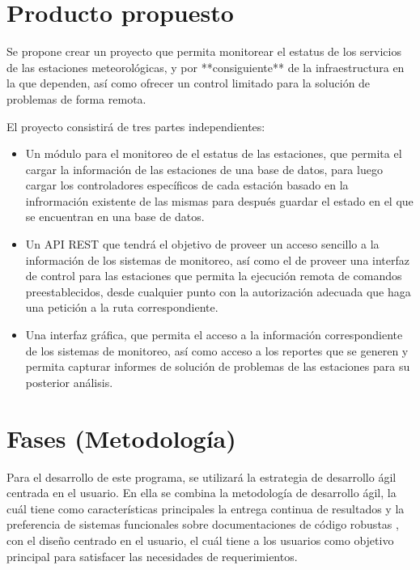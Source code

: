 \section{Producto propuesto}


Se propone crear un proyecto que permita monitorear el estatus de los servicios de las estaciones meteorológicas, y por **consiguiente** de la infraestructura en la que dependen, así como ofrecer un control limitado para la solución de problemas de forma remota.

El proyecto consistirá de tres partes independientes:

\begin{itemize}
   \item Un módulo para el monitoreo de el estatus de las estaciones, que permita el cargar la información de las estaciones de una base de datos, para luego cargar los controladores específicos de cada estación basado en la infrormación existente de las mismas para después guardar el estado en el que se encuentran en una base de datos.

   \item Un API REST que tendrá el objetivo de proveer un acceso sencillo a la información de los sistemas de monitoreo, así como el de proveer una interfaz de control para las estaciones que permita la ejecución remota de comandos preestablecidos, desde cualquier punto con la autorización adecuada que haga una petición a la ruta correspondiente.

   \item Una interfaz gráfica, que permita el acceso a la información correspondiente de los sistemas de monitoreo, así como acceso a los reportes que se generen y permita capturar informes de solución de problemas de las estaciones para su posterior análisis.

\end{itemize}

\section{Fases (Metodología)}


Para el desarrollo de este programa, se utilizará la estrategia de desarrollo ágil centrada en el usuario. En ella se combina la metodología de desarrollo ágil, la cuál tiene como características principales la entrega continua de resultados y la preferencia de sistemas funcionales sobre documentaciones de código robustas \cite{agile_manifesto}, con el diseño centrado en el usuario, el cuál tiene a los usuarios como objetivo principal para satisfacer las necesidades de requerimientos.

